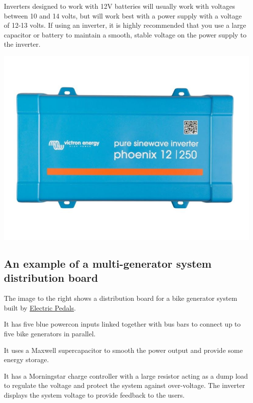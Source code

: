 \documentclass{article}
\theoremstyle{definition}
\theoremstyle{definition}
\theoremstyle{remark}
\begin{document}
    Inverters designed to work with 12V batteries will usually work with voltages between 10 and 14 volts, but will work best with a power supply with a voltage of 12-13 volts. If using an inverter, it is highly recommended that you use a large capacitor or battery to maintain a smooth, stable voltage on the power supply to the inverter.
  
    \begin{center}
      \includegraphics[width=0.15\paperwidth]{../Images/image_5_3_(inverter).png}
    \end{center}


  \subsection{An example of a multi-generator system distribution board} %
  \label{sub:an_example_of_a_multi_generator_system_distribution_board}

    The image to the right shows a distribution board for a bike generator system built by \href{https://www.electricpedals.com/}{Electric Pedals}.

    It has five blue powercon inputs linked together with bus bars to connect up to five bike generators in parallel. 

    It uses a Maxwell supercapacitor to smooth the power output and provide some energy storage.

    It has a Morningstar charge controller with a large resistor acting as a dump load to regulate the voltage and protect the system against over-voltage. The inverter displays the system voltage to provide feedback to the users.
\end{document}
